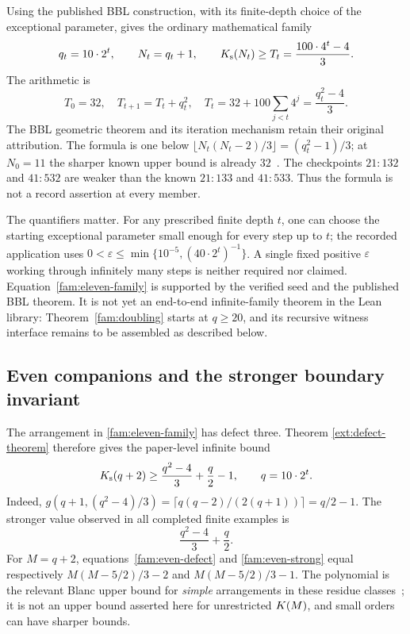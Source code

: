 Using the published BBL construction, with its finite-depth choice of
the exceptional parameter, gives the ordinary mathematical family
\begin{equation}
 q_t=10\cdot2^t,\qquad N_t=q_t+1,\qquad
 K_{\mathrm{s}}(N_t)\geq T_t=\frac{100\cdot4^t-4}{3}.
 \label{fam:eleven-family}
\end{equation}
The arithmetic is
\[
 T_0=32,\quad T_{t+1}=T_t+q_t^2,
 \quad
 T_t=32+100\sum_{j<t}4^j=\frac{q_t^2-4}{3}.
\]
The BBL geometric theorem and its iteration mechanism retain their
original attribution.  The formula is one below
$\lfloor N_t(N_t-2)/3\rfloor=(q_t^2-1)/3$; at $N_0=11$ the sharper known
upper bound is already $32$~\cite{savchuk2025}.
The checkpoints $21:132$ and $41:532$ are weaker than the known
$21:133$ and $41:533$.  Thus the formula is not a record assertion at
every member.

The quantifiers matter.  For any prescribed finite depth $t$, one can
choose the starting exceptional parameter small enough for every step
up to $t$; the recorded application uses
$0<\varepsilon\leq\min\{10^{-5},(40\cdot2^t)^{-1}\}$.
A single fixed positive $\varepsilon$ working through infinitely many
steps is neither required nor claimed.  Equation~\eqref{fam:eleven-family}
is supported by the verified seed and the published BBL theorem.  It is
not yet an end-to-end infinite-family theorem in the Lean library:
Theorem~\ref{fam:doubling} starts at $q\geq20$, and its recursive witness
interface remains to be assembled as described below.

\subsection{Even companions and the stronger boundary invariant}

The arrangement in \eqref{fam:eleven-family} has defect three.  Theorem
\ref{ext:defect-theorem} therefore gives the paper-level infinite bound
\begin{equation}
 K_{\mathrm{s}}(q+2)\geq\frac{q^2-4}{3}+\frac q2-1,
 \qquad q=10\cdot2^t.
 \label{fam:even-defect}
\end{equation}
Indeed,
$g(q+1,(q^2-4)/3)=\lceil q(q-2)/(2(q+1))\rceil=q/2-1$.
The stronger value observed in all completed finite examples is
\begin{equation}
 \frac{q^2-4}{3}+\frac q2.
 \label{fam:even-strong}
\end{equation}
For $M=q+2$, equations~\eqref{fam:even-defect} and
\eqref{fam:even-strong} equal respectively
$M(M-5/2)/3-2$ and $M(M-5/2)/3-1$.
The polynomial is the relevant Blanc upper bound for \emph{simple}
arrangements in these residue classes~\cite{blanc2011}; it is not an
upper bound asserted here for unrestricted $K(M)$, and small orders
can have sharper bounds.

